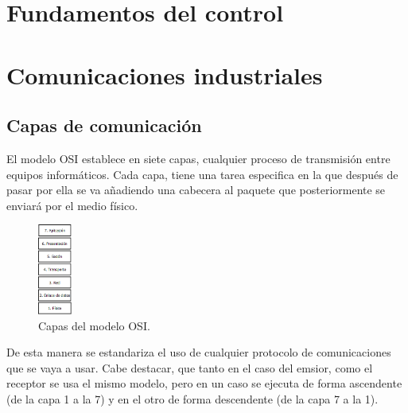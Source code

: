 \section{Fundamentos del control}
\label{arte_control}
\section{Comunicaciones industriales}
\label{arte_comunicaciones}

\subsection{Capas de comunicación}
\label{comunic_capas}
El modelo OSI establece en siete capas, cualquier proceso de transmisión entre equipos informáticos. Cada capa, tiene una tarea especifica en la que después de pasar por ella se va añadiendo una cabecera al paquete que posteriormente se enviará por el medio físico.
    \begin{figure}[H]
            \centering
            \includegraphics[width=0.1\textwidth]{images/capas_osi.png}
            \caption{Capas del modelo OSI.}
            \label{fig:capas_osi}
    \end{figure}
De esta manera se estandariza el uso de cualquier protocolo de comunicaciones que se vaya a usar. Cabe destacar, que tanto en el caso del emsior, como el receptor se usa el mismo modelo, pero en un caso se ejecuta de forma ascendente (de la capa 1 a la 7) y en el otro de forma descendente (de la capa 7 a la 1).

